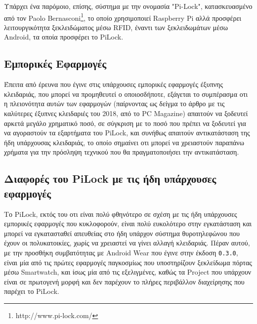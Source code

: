 		Υπάρχει ένα παρόμοιο, επίσης, σύστημα με την ονομασία "Pi-Lock", κατασκευασμένο από τον Paolo Bernasconi\footnote{http://www.pi-lock.com/}, το οποίο χρησιμοποιεί Raspberry Pi αλλά προσφέρει λειτουργικότητα ξεκλειδώματος μέσω RFID, έναντι των ξεκλειδωμάτων μέσω Android, τα οποία προσφέρει το PiLock.

	\subsection{Εμπορικές Εφαρμογές}
		Έπειτα από έρευνα που έγινε στις υπάρχουσες εμπορικές εφαρμογές έξυπνης κλειδαριάς, που μπορεί να προμηθευτεί ο οποιοσδήποτε, εξάγεται το συμπέρασμα οτι η πλειονότητα αυτών των εφαρμογών (παίρνοντας ως δείγμα το άρθρο με τις καλύτερες έξυπνες κλειδαριές του 2018, από το PC Magazine) απαιτούν να ξοδευτεί αρκετά μεγάλο χρηματικό ποσό, σε σύγκριση με το ποσό που πρέπει να ξοδευτεί για να αγοραστούν τα εξαρτήματα του PiLock, και συνήθως απαιτούν αντικατάσταση της ήδη υπάρχουσας κλειδαριάς, το οποίο σημαίνει οτι μπορεί να χρειαστούν παραπάνω χρήματα για την πρόσληψη τεχνικού που θα πραγματοποιήσει την αντικατάσταση.

	\subsection{Διαφορές του PiLock με τις ήδη υπάρχουσες εφαρμογές}
		\label{pilock_innovation}
		Το PiLock, εκτός του οτι είναι πολύ φθηνότερο σε σχέση με τις ήδη υπάρχουσες εμπορικές εφαρμογές που κυκλοφορούν, είναι πολύ ευκολότερο στην εγκατάσταση και μπορεί να εγκατασταθεί απευθείας στο ήδη υπάρχον σύστημα θυροτηλεφώνου που έχουν οι πολυκατοικίες, χωρίς να χρειαστεί να γίνει αλλαγή κλειδαριάς. Πέραν αυτού, με την προσθήκη συμβατότητας με Android Wear που έγινε στην έκδοση \verb|0.3.0|, είναι μία από τις πρώτες εφαρμογές παγκοσμίως που υποστηρίζουν ξεκλείδωμα πόρτας μέσω Smartwatch, και ίσως μία από τις εξελιγμένες, καθώς τα Project που υπάρχουν είναι σε πρωτογενή μορφή και δεν παρέχουν το πλήρες περιβάλλον διαχείρησης που παρέχει το PiLock.